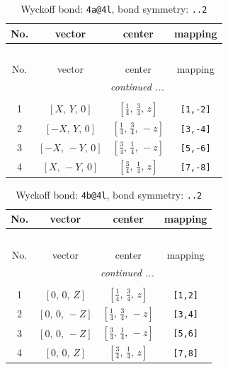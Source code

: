 \documentclass[fleqn,8pt]{jsarticle}
\begin{document}
\begin{longtable}{cccc}
\caption{Wyckoff bond: {\tt 4a@4l}, bond symmetry: {\tt ..2}}
 \\
 \hline \hline
No. & vector & center & mapping \\ \hline \endfirsthead

\multicolumn{3}{l}{\tablename\ \thetable{}} \\
 \hline \hline
No. & vector & center & mapping \\ \hline \endhead

 \hline \hline
\multicolumn{3}{r}{\footnotesize\it continued ...} \\ \endfoot

 \hline \hline
\multicolumn{3}{r}{} \\ \endlastfoot

1 & $\left[ X,\, Y,\, 0 \right]$ & $\left[ \frac{1}{4},\, \frac{3}{4},\, z \right]$ & {\tt [1,-2]} \\ \hline
2 & $\left[ - X,\, Y,\, 0 \right]$ & $\left[ \frac{1}{4},\, \frac{3}{4},\, - z \right]$ & {\tt [3,-4]} \\ \hline
3 & $\left[ - X,\, - Y,\, 0 \right]$ & $\left[ \frac{3}{4},\, \frac{1}{4},\, - z \right]$ & {\tt [5,-6]} \\ \hline
4 & $\left[ X,\, - Y,\, 0 \right]$ & $\left[ \frac{3}{4},\, \frac{1}{4},\, z \right]$ & {\tt [7,-8]} \\
\end{longtable}
\renewcommand{\arraystretch}{1.2}
\begin{longtable}{cccc}
\caption{Wyckoff bond: {\tt 4b@4l}, bond symmetry: {\tt ..2}}
 \\
 \hline \hline
No. & vector & center & mapping \\ \hline \endfirsthead

\multicolumn{3}{l}{\tablename\ \thetable{}} \\
 \hline \hline
No. & vector & center & mapping \\ \hline \endhead

 \hline \hline
\multicolumn{3}{r}{\footnotesize\it continued ...} \\ \endfoot

 \hline \hline
\multicolumn{3}{r}{} \\ \endlastfoot

1 & $\left[ 0,\, 0,\, Z \right]$ & $\left[ \frac{1}{4},\, \frac{3}{4},\, z \right]$ & {\tt [1,2]} \\ \hline
2 & $\left[ 0,\, 0,\, - Z \right]$ & $\left[ \frac{1}{4},\, \frac{3}{4},\, - z \right]$ & {\tt [3,4]} \\ \hline
3 & $\left[ 0,\, 0,\, - Z \right]$ & $\left[ \frac{3}{4},\, \frac{1}{4},\, - z \right]$ & {\tt [5,6]} \\ \hline
4 & $\left[ 0,\, 0,\, Z \right]$ & $\left[ \frac{3}{4},\, \frac{1}{4},\, z \right]$ & {\tt [7,8]} \\
\end{longtable}
\end{document}
